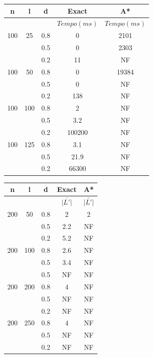 \documentclass[12pt]{article}
\begin{document}
		\vspace{2cm}

		\begin{tabular}{c|c|c|c|c} \hline
			n & l & d & Exact & A* \\ \hline
			& & & $Tempo(ms)$ & $Tempo(ms)$\\ \hline
			100 & 25  & 0.8 &  0 & 2101\\
			   &      & 0.5 &  0 & 2303\\
			   &      & 0.2 & 11 & NF\\ \hline
			100 & 50  & 0.8 &  0 & 19384 \\
			   &      & 0.5 &  0 & NF\\
			   &      & 0.2 & 138 & NF\\ \hline
			100 & 100 & 0.8 &  2 & NF\\
			   &      & 0.5 & 3.2 & NF\\
			   &      & 0.2 & 100200 & NF\\ \hline
			100 & 125 & 0.8 & 3.1 & NF\\
			   &      & 0.5 & 21.9 & NF\\
			   &      & 0.2 & 66300 & NF\\ \hline
		\end{tabular}


		
		\vspace{2cm}

		\begin{tabular}{c|c|c|c|c} \hline
			n & l & d & Exact & A* \\ \hline
			& & & $\bar{|L'|}$ & $\bar{|L'|}$ \\ \hline
			200 & 50  & 0.8 & 2 & 2\\
			   &      & 0.5 & 2.2 & NF\\
			   &      & 0.2 & 5.2 & NF\\ \hline
			200 & 100  & 0.8 & 2.6 & NF \\
			   &      & 0.5 & 3.4 & NF\\
			   &      & 0.5 & NF & NF\\ \hline
			200 & 200 & 0.8 &  4 & NF\\
			   &      & 0.5 & NF & NF\\
			   &      & 0.2 & NF & NF\\ \hline
			200 & 250 & 0.8 & 4 & NF\\
			   &      & 0.5 & NF & NF\\
			   &      & 0.2 & NF & NF\\ \hline
		\end{tabular}
\end{document}
